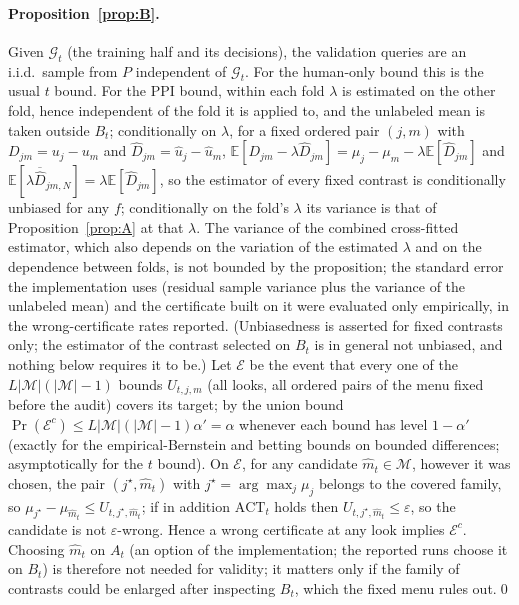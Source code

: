 \documentclass{article}
\newcommand{\eps}{\varepsilon}
\newcommand{\ACT}{\mathrm{ACT}}
\begin{document}
\paragraph{Proposition~\ref{prop:B}.} Given $\mathcal G_t$ (the training half and its decisions), the validation queries are an i.i.d.\ sample from $P$ independent of $\mathcal G_t$. For the human-only bound this is the usual $t$ bound. For the PPI bound, within each fold $\lambda$ is estimated on the other fold, hence independent of the fold it is applied to, and the unlabeled mean is taken outside $B_t$; conditionally on $\lambda$, for a fixed ordered pair $(j,m)$ with $D_{jm}=u_j-u_m$ and $\hat D_{jm}=\hat u_j-\hat u_m$, $\mathbb E[D_{jm}-\lambda\hat D_{jm}]=\mu_j-\mu_m-\lambda\mathbb E[\hat D_{jm}]$ and $\mathbb E[\lambda\overline{\hat D}_{jm,N}]=\lambda\mathbb E[\hat D_{jm}]$, so the estimator of every fixed contrast is conditionally unbiased for any $f$; conditionally on the fold's $\lambda$ its variance is that of Proposition~\ref{prop:A} at that $\lambda$. The variance of the combined cross-fitted estimator, which also depends on the variation of the estimated $\lambda$ and on the dependence between folds, is not bounded by the proposition; the standard error the implementation uses (residual sample variance plus the variance of the unlabeled mean) and the certificate built on it were evaluated only empirically, in the wrong-certificate rates reported. (Unbiasedness is asserted for fixed contrasts only; the estimator of the contrast selected on $B_t$ is in general not unbiased, and nothing below requires it to be.) Let $\mathcal E$ be the event that every one of the $L|\mathcal M|(|\mathcal M|-1)$ bounds $U_{t,j,m}$ (all looks, all ordered pairs of the menu fixed before the audit) covers its target; by the union bound $\Pr(\mathcal E^c)\le L|\mathcal M|(|\mathcal M|-1)\alpha'=\alpha$ whenever each bound has level $1-\alpha'$ (exactly for the empirical-Bernstein and betting bounds on bounded differences; asymptotically for the $t$ bound). On $\mathcal E$, for any candidate $\hat m_t\in\mathcal M$, however it was chosen, the pair $(j^\star,\hat m_t)$ with $j^\star=\arg\max_j\mu_j$ belongs to the covered family, so $\mu_{j^\star}-\mu_{\hat m_t}\le U_{t,j^\star,\hat m_t}$; if in addition $\ACT_t$ holds then $U_{t,j^\star,\hat m_t}\le\eps$, so the candidate is not $\eps$-wrong. Hence a wrong certificate at any look implies $\mathcal E^c$. Choosing $\hat m_t$ on $A_t$ (an option of the implementation; the reported runs choose it on $B_t$) is therefore not needed for validity; it matters only if the family of contrasts could be enlarged after inspecting $B_t$, which the fixed menu rules out.\qed
\end{document}
